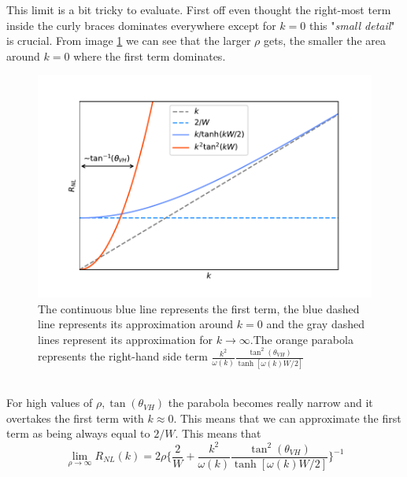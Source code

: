 This limit is a bit tricky to evaluate. First off even thought the right-most term inside the curly braces dominates everywhere except for $k=0$ this "\emph{small detail}" is crucial. From image \ref{fig:rho1} we can see that the larger $\rho$ gets, the smaller the area around $k=0$ where the first term dominates.
\begin{figure}[h!]
    \centering
    \includegraphics[width=\linewidth]{Immagini/rnl/rho1.pdf}
    \caption{The continuous blue line represents the first term, the blue dashed line represents its approximation around $k=0$ and the gray dashed lines represent its approximation for $k\to \infty$.\newline The orange parabola represents the right-hand side term $\frac {k^2}{\omega(k)}\frac{\tan^2(\theta_{VH})}{\tanh[\omega(k)W/2]}$}
    \label{fig:rho1}
\end{figure}\\
For high values of $\rho, \tan(\theta_{VH})$ the parabola becomes really narrow and it overtakes the first term with $k\approx 0$. This means that we can approximate the first term as being always equal to $2/W$. This means that
\begin{equation}
    \lim_{\rho\to\infty} R_{NL}(k)=2\rho
    \bigg\{
        \frac 2W+ \frac {k^2}{\omega(k)}\frac{\tan^2(\theta_{VH})}{\tanh[\omega(k)W/2]}    
    \bigg\}^{-1}
\end{equation}


